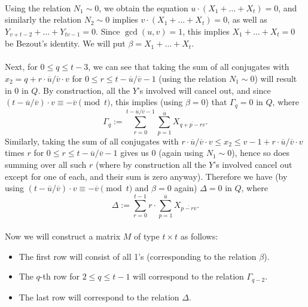 \documentclass[12pt,a4paper]{article}
\newcommand{\uo}{\overline{u}}
\newcommand{\vo}{\overline{v}}
\begin{document}
\paragraph*{}
Using the relation $N_1\sim 0$, we obtain the equation $u\cdot (X_1+\dots+X_t)=0$, and similarly the relation $N_2\sim 0$ implies $v\cdot (X_1+\dots+X_t)=0$, as well as $Y_{v+t-2}+\dots+Y_{tv-1}=0$. Since $\gcd(u,v)=1$, this implies $X_1+\dots+X_t=0$ be Bezout's identity. We will put $\beta=X_1+\dots+X_t$.
\paragraph*{}
Next, for $0\leq q \leq t-3$, we can see that taking the sum of all conjugates with $x_2=q+r\cdot \uo/\vo\cdot v$ for $0\leq r\leq t-\uo/\vo-1$ (using the relation $N_1\sim 0$) will result in $0$ in $Q$. By construction, all the $Y$'s involved will cancel out, and since $(t-\uo/\vo)\cdot v\equiv -\vo \pmod{t}$, this implies (using $\beta=0$) that $\Gamma_q=0$ in $Q$, where
$$\Gamma_q:=\sum_{r=0}^{t-\uo/\vo-1}\sum_{p=1}^{\uo}X_{\overline{q+p-rv}}.$$
Similarly, taking the sum of all conjugates with $r\cdot \uo/\vo\cdot v\leq x_2\leq v-1+r\cdot \uo/\vo\cdot v$ times $r$ for $0\leq r\leq t-\uo/\vo-1$ gives us $0$ (again using $N_1\sim 0$), hence so does summing over all such $r$ (where by construction all the $Y$'s involved cancel out except for one of each, and their sum is zero anyway). Therefore we have (by using $(t-\uo/\vo)\cdot v\equiv -\vo \pmod{t}$ and $\beta=0$ again) $\Delta=0$ in $Q$, where
$$\Delta:=\sum_{r=0}^{t-1}r\cdot\sum_{p=1}^{\uo}X_{\overline{p-rv}}.$$
\paragraph*{}
Now we will construct a matrix $M$ of type $t\times t$ as follows:
\begin{itemize}
\item The first row will consist of all 1's (corresponding to the relation $\beta$).
\item The $q$-th row for $2\leq q\leq t-1$ will correspond to the relation $\Gamma_{q-2}$.
\item The last row will correspond to the relation $\Delta$.
\end{itemize}
\end{document}
